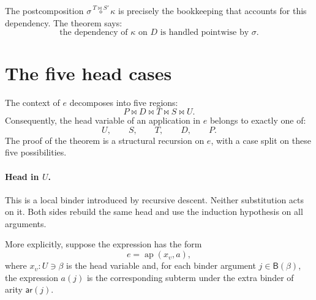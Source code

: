 \documentclass[11pt]{article}
\newcommand{\B}{\mathsf{B}}
\newcommand{\arity}{\mathsf{ar}}
\newcommand{\pcomp}[3]{#1 \overset{#2}{\circ} #3}
\begin{document}
The postcomposition \(\pcomp{\sigma}{T \bowtie S'}{\kappa}\) is precisely the
bookkeeping that accounts for this dependency.  The theorem says:
\[
  \text{the dependency of \(\kappa\) on \(D\) is handled pointwise by \(\sigma\).}
\]

\section*{The five head cases}

The context of \(e\) decomposes into five regions:
\[
  P \bowtie D \bowtie T \bowtie S \bowtie U.
\]
Consequently, the head variable of an application in \(e\) belongs to exactly
one of:
\[
  U,\qquad S,\qquad T,\qquad D,\qquad P.
\]
The proof of the theorem is a structural recursion on \(e\), with a case split
on these five possibilities.

\paragraph{Head in \(U\).}
This is a local binder introduced by recursive descent.  Neither substitution
acts on it.  Both sides rebuild the same head and use the induction hypothesis
on all arguments.

More explicitly, suppose the expression has the form
\[
  e = \operatorname{ap}(x_\upsilon,a),
\]
where \(x_\upsilon : U \ni \beta\) is the head variable and, for each binder
argument \(j \in \B(\beta)\), the expression \(a(j)\) is the corresponding
subterm under the extra binder of arity \(\arity(j)\).
\end{document}
